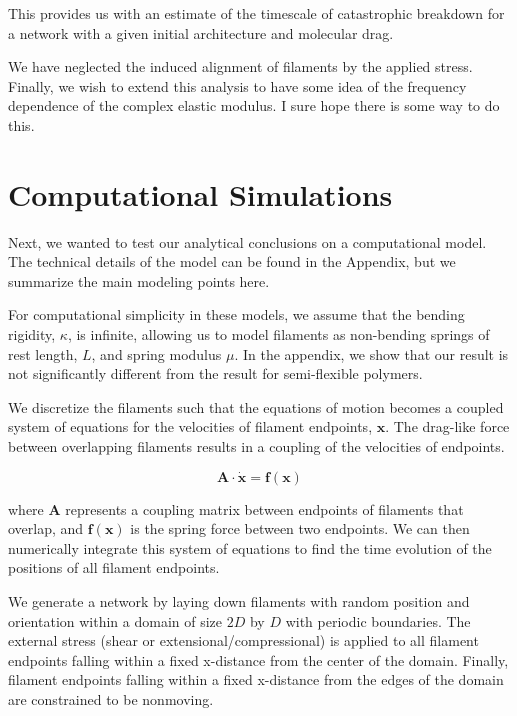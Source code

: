 \documentclass[prb,11pt]{revtex4-1}
\begin{document}
This provides us with an estimate of the timescale of catastrophic breakdown for a network with a given initial architecture and molecular drag.

We have neglected the induced alignment of filaments by the applied stress.  Finally, we wish to extend this analysis to have some idea of the frequency dependence of the complex elastic modulus.  I sure hope there is some way to do this.



\section{Computational Simulations}

Next, we wanted to test our analytical conclusions on a computational model.  The technical details of the model can be found in the Appendix, but we summarize the main modeling points here.

For computational simplicity in these models, we assume that the bending rigidity, $\kappa$, is infinite, allowing us to model filaments as non-bending springs of rest length, $L$, and spring modulus $\mu$.  In the appendix, we show that our result is not significantly different from the result for semi-flexible polymers.

We discretize the filaments such that the equations of motion becomes a coupled system of equations for the velocities of filament endpoints, $\mathbf{x}$.  The drag-like force between overlapping filaments results in a coupling of the velocities of endpoints.  

\begin{equation}
\mathbf{A \cdot \dot x} = \mathbf{f(x)}
\end{equation}

where $\mathbf{A }$ represents a coupling matrix between endpoints of filaments that overlap, and $\mathbf{f(x)}$ is the spring force between two endpoints.  We can then numerically integrate this system of equations to find the time evolution of the positions of all filament endpoints.

We generate a network by laying down filaments with random position and orientation within a domain of size $2D$ by $D$ with periodic boundaries.  The external stress (shear or extensional/compressional) is applied to all filament endpoints falling within a fixed x-distance from the center of the domain.  Finally, filament endpoints falling within a fixed x-distance from the edges of the domain are constrained to be nonmoving.
\end{document}
